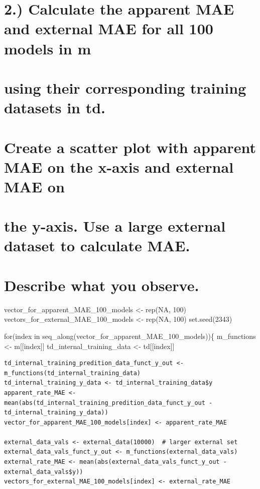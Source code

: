 \documentclass[
  letterpaper,
  DIV=11,
  numbers=noendperiod]{scrreprt}
\begin{document}
\chapter{2.) Calculate the apparent MAE and external MAE for all 100
models in
m}\label{calculate-the-apparent-mae-and-external-mae-for-all-100-models-in-m}


\chapter{using their corresponding training datasets in
td.}\label{using-their-corresponding-training-datasets-in-td.}


\chapter{Create a scatter plot with apparent MAE on the x-axis and
external MAE
on}\label{create-a-scatter-plot-with-apparent-mae-on-the-x-axis-and-external-mae-on}


\chapter{the y-axis. Use a large external dataset to calculate
MAE.}\label{the-y-axis.-use-a-large-external-dataset-to-calculate-mae.}


\chapter{Describe what you observe.}\label{describe-what-you-observe.}

vector\_for\_apparent\_MAE\_100\_models \textless- rep(NA, 100)
vectors\_for\_external\_MAE\_100\_models \textless- rep(NA, 100)
set.seed(2343)

for(index in seq\_along(vector\_for\_apparent\_MAE\_100\_models))\{
m\_functions \textless- m{[}{[}index{]}{]} td\_internal\_training\_data
\textless- td{[}{[}index{]}{]}

\begin{verbatim}
td_internal_training_predition_data_funct_y_out <- m_functions(td_internal_training_data)
td_internal_training_y_data <- td_internal_training_data$y
apparent_rate_MAE <- mean(abs(td_internal_training_predition_data_funct_y_out - td_internal_training_y_data))
vector_for_apparent_MAE_100_models[index] <- apparent_rate_MAE

external_data_vals <- external_data(10000)  # larger external set
external_data_vals_funct_y_out <- m_functions(external_data_vals)
external_rate_MAE <- mean(abs(external_data_vals_funct_y_out - external_data_vals$y))
vectors_for_external_MAE_100_models[index] <- external_rate_MAE
\end{verbatim}
\end{document}
